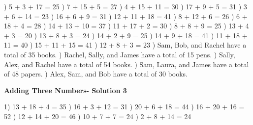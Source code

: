 \documentclass{article}%
\begin{document}
) 5 + 3 + 17 = 25%
) 7 + 15 + 5 = 27%
) 4 + 15 + 11 = 30%
) 17 + 9 + 5 = 31%
) 3 + 6 + 14 = 23%
) 16 + 6 + 9 = 31%
) 12 + 11 + 18 = 41%
) 8 + 12 + 6 = 26%
) 6 + 18 + 4 = 28%
) 14 + 13 + 10 = 37%
) 11 + 17 + 2 = 30%
) 8 + 8 + 9 = 25%
) 13 + 4 + 3 = 20%
) 13 + 8 + 3 = 24%
) 14 + 2 + 9 = 25%
) 14 + 9 + 18 = 41%
) 11 + 18 + 11 = 40%
) 15 + 11 + 15 = 41%
) 12 + 8 + 3 = 23%
) Sam, Bob, and Rachel have a total of 35 books.%
) Rachel, Sally, and James have a total of 15 pens.%
) Sally, Alex, and Rachel have a total of 54 books.%
) Sam, Laura, and James have a total of 48 papers.%
) Alex, Sam, and Bob have a total of 30 books.%
\newline%
\newpage%
\large%
\begin{center}%
\textbf{Adding Three Numbers- Solution 3}%
\newline%
\end{center} \normalsize%
1) 13 + 18 + 4 = 35%
) 16 + 3 + 12 = 31%
) 20 + 6 + 18 = 44%
) 16 + 20 + 16 = 52%
) 12 + 14 + 20 = 46%
) 10 + 7 + 7 = 24%
) 2 + 8 + 14 = 24%
\end{document}
